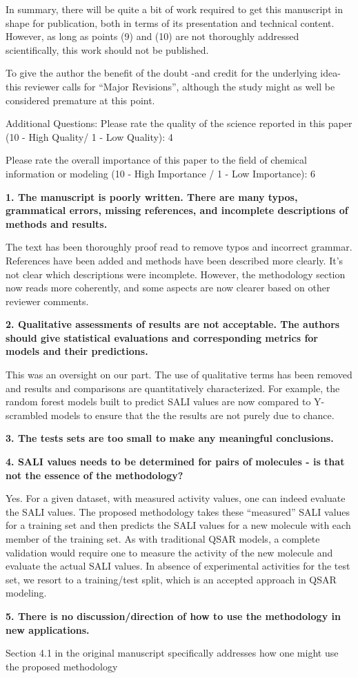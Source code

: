 \documentclass[letterpaper, 12pt]{article}
\begin{document}
In summary, there will be quite a bit of work required to get this manuscript in shape for publication, both in terms of its presentation and technical content. However, as long as points (9) and (10) are not thoroughly addressed scientifically, this work should not be published.

To give the author the benefit of the doubt -and credit for the underlying idea- this reviewer calls for “Major Revisions”, although the study might as well be considered premature at this point. 

Additional Questions:
Please rate the quality of the science reported in this paper (10 - High Quality/ 1 - Low Quality): 4

Please rate the overall importance of this paper to the field of chemical information or modeling (10 - High Importance / 1 - Low Importance): 6


\textbf{1.  The manuscript is poorly written.  There are many typos, grammatical errors, missing
  references, and incomplete descriptions of methods and results.}

The text has been thoroughly proof read to remove typos and incorrect grammar. References have been
added and methods have been described more clearly. It's not clear which descriptions were
incomplete. However, the methodology section now reads more coherently, and some aspects are now
clearer based on other reviewer comments.

\textbf{2.  Qualitative assessments of results are not acceptable.  The authors should give
  statistical evaluations and corresponding metrics for models and their predictions.}

This was an oversight on our part. The use of qualitative terms has been removed and results and
comparisons are quantitatively characterized. For example,  the random forest models built to
predict SALI values are now compared to Y-scrambled models to ensure that the the results are not
purely due to chance. 

\textbf{3.  The tests sets are too small to make any meaningful conclusions.}

\textbf{4.  SALI values needs to be determined for pairs of molecules - is that not the essence of
  the methodology?}

Yes. For a given dataset, with measured activity values, one can
indeed evaluate the SALI values. The proposed methodology takes these
``measured'' SALI values for a training set and then predicts the SALI
values for a new molecule with each member of the training set. As
with traditional QSAR models, a complete validation would require one
to measure the activity of the new molecule and evaluate the actual
SALI values. In absence of experimental activities for the test set,
we resort to a training/test split, which is an accepted approach in
QSAR modeling.

\textbf{5.  There is no discussion/direction of how to use the methodology in new applications.}

Section 4.1 in the original manuscript specifically addresses how one
might use the proposed methodology 
\end{document}
